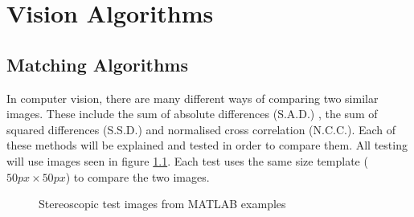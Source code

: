 \chapter{Vision Algorithms} \label{Chapter:InvestigationVision}

\section{Matching Algorithms}\label{Section:Comparison}
In computer vision, there are many different ways of comparing two similar images. These include the sum of absolute differences (S.A.D.) \citep{Hamzah:DistanceDetection}, the sum of squared differences (S.S.D.)\citep{Mrovlje:Distance_Stereoscopic} and  normalised cross correlation (N.C.C.)\citep{zhao2006image}. Each of these methods will be explained and tested in order to compare them. All testing will use images seen in figure \ref{fig:StereoTest}. Each test uses the same size template ($50px\times50px$) to compare the two images. 

\begin{figure}
\centering
{}
\caption{Stereoscopic test images from MATLAB examples}
\label{fig:StereoTest}
\end{figure}


